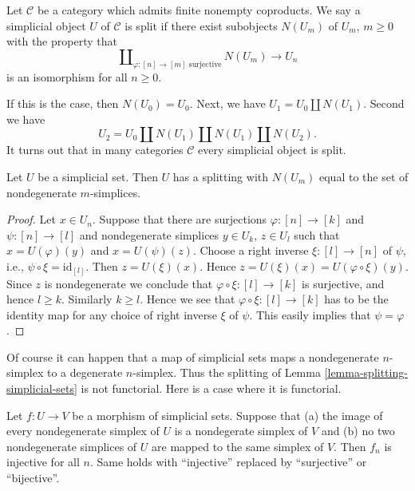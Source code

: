 \begin{definition}
\label{definition-split}
Let $\mathcal{C}$ be a category which admits finite nonempty coproducts.
We say a simplicial object $U$ of $\mathcal{C}$ is split
if there exist subobjects $N(U_m)$ of $U_m$, $m \geq 0$
with the property that
\begin{equation}
\label{equation-splitting}
\coprod\nolimits_{\varphi : [n] \to [m]\text{ surjective}}
N(U_m)
\longrightarrow
U_n
\end{equation}
is an isomorphism for all $n \geq 0$.
\end{definition}

\noindent
If this is the case, then $N(U_0) = U_0$. Next, we have
$U_1 = U_0 \coprod N(U_1)$. Second we have
$$
U_2 = U_0 \coprod N(U_1) \coprod N(U_1) \coprod N(U_2).
$$
It turns out that in many categories $\mathcal{C}$
every simplicial object is split.

\begin{lemma}
\label{lemma-splitting-simplicial-sets}
Let $U$ be a simplicial set.
Then $U$ has a splitting
with $N(U_m)$ equal to the set of 
nondegenerate $m$-simplices.
\end{lemma}

\begin{proof}
Let $x \in U_n$. Suppose that
there are surjections $\varphi : [n] \to [k]$
and $\psi : [n] \to [l]$ and nondegenerate simplices
$y \in U_k$, $z \in U_l$ such that $x = U(\varphi)(y)$
and $x = U(\psi)(z)$. Choose a right inverse $\xi : [l] \to [n]$
of $\psi$, i.e., $\psi \circ \xi = \text{id}_{[l]}$.
Then $z = U(\xi)(x)$. Hence $z = U(\xi)(x) = U(\varphi \circ \xi)(y)$.
Since $z$ is nondegenerate we conclude that $\varphi \circ \xi :
[l] \to [k]$ is surjective, and hence $l \geq k$. Similarly
$k \geq l$. Hence we see that $\varphi \circ \xi : [l] \to [k]$
has to be the identity map for any choice of right inverse
$\xi$ of $\psi$. This easily implies that $\psi = \varphi$.
\end{proof}

\noindent
Of course it can happen that a map of simplicial sets
maps a nondegenerate $n$-simplex to a degenerate $n$-simplex.
Thus the splitting of Lemma \ref{lemma-splitting-simplicial-sets}
is not functorial. Here is a case where it is functorial.

\begin{lemma}
\label{lemma-injective-map-simplicial-sets}
Let $f : U \to V$ be a morphism of simplicial sets.
Suppose that (a) the image of every nondegenerate simplex of
$U$ is a nondegerate simplex of $V$ and (b)
no two nondegenerate simplices of $U$ are mapped
to the same simplex of $V$.
Then $f_n$ is injective for all $n$.
Same holds with ``injective'' replaced by
``surjective'' or ``bijective''.
\end{lemma}

